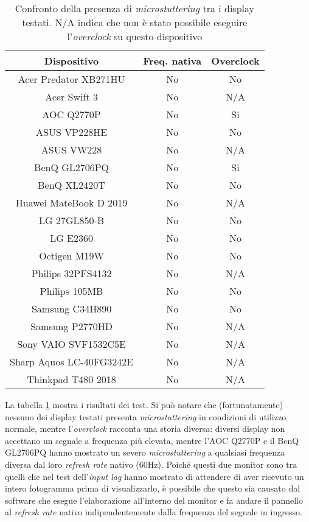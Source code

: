\begin{table}[h!]
	\centering
	\begin{tabular}{|c|c|c|} 
		\hline
		\textbf{Dispositivo} & \textbf{Freq. nativa} & \textbf{Overclock}  \\ 
		\hline
		Acer Predator XB271HU & No & No \\ \hline
		Acer Swift 3 & No & N/A \\ \hline
		AOC Q2770P & No & Si \\ \hline
		ASUS VP228HE & No & No \\ \hline
		ASUS VW228 & No & N/A \\ \hline
		BenQ GL2706PQ & No & Si \\ \hline
		BenQ XL2420T & No & No \\ \hline
		Huawei MateBook D 2019 & No & N/A \\ \hline
		LG 27GL850-B & No & No \\ \hline
		LG E2360 & No & No \\ \hline
		Octigen M19W & No & No \\ \hline
		Philips 32PFS4132 & No & N/A \\ \hline
		Philips 105MB & No & No \\ \hline
		Samsung C34H890 & No & No \\ \hline
		Samsung P2770HD & No & N/A \\ \hline
		Sony VAIO SVF1532C5E & No & N/A \\ \hline
		Sharp Aquos LC-40FG3242E & No & N/A \\ \hline
		Thinkpad T480 2018 & No & N/A \\ \hline
	\end{tabular}
	\caption{\label{tab:microstuttering_list}Confronto della presenza di \textit{microstuttering} tra i display testati. N/A indica che non è stato possibile eseguire l'\textit{overclock} su questo dispositivo}
\end{table}

La tabella \ref{tab:microstuttering_list} mostra i risultati dei test. Si può notare che (fortunatamente) nessuno dei display testati presenta \textit{microstuttering} in condizioni di utilizzo normale, mentre l'\textit{overclock} racconta una storia diversa: diversi display non accettano un segnale a frequenza più elevata, mentre l'AOC Q2770P e il BenQ GL2706PQ hanno mostrato un severo \textit{microstuttering} a qualsiasi frequenza diversa dal loro \textit{refresh rate} nativo (60Hz). Poiché questi due monitor sono tra quelli che nel test dell'\textit{input lag} hanno mostrato di attendere di aver ricevuto un intero fotogramma prima di visualizzarlo, è possibile che questo sia causato dal software che esegue l'elaborazione all'interno del monitor e fa andare il pannello al \textit{refresh rate} nativo indipendentemente dalla frequenza del segnale in ingresso.

